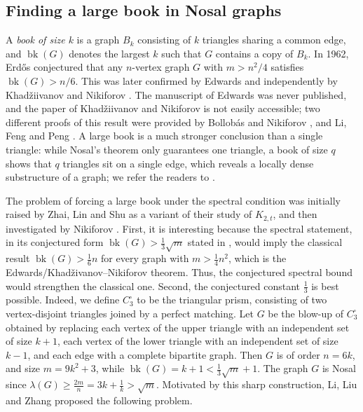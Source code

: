 \documentclass[10pt,a4paper]{amsart}
\newcommand{\bk}{\operatorname{bk}}
\renewcommand{\ge}{\geqslant}
\begin{document}
\subsection{Finding a large book in Nosal graphs}

A \emph{book of size $k$} is a graph $B_k$ consisting of $k$ triangles sharing a common edge, and $\bk(G)$ denotes the largest $k$ such that $G$ contains a copy of $B_k$. 
In 1962, Erd\H{o}s \cite{Erd1962} conjectured that any $n$-vertex graph $G$ with $m>n^2/4$ satisfies \( \bk (G) >  n/6 \). 
This was later confirmed by Edwards \cite{Edw1977} and independently by Khad\v{z}iivanov and Nikiforov  \cite{KN1979}. 
The manuscript of Edwards was never published, and the paper of Khad\v{z}iivanov and Nikiforov is not easily accessible;  
two different proofs of this result were  provided by Bollob\'{a}s and Nikiforov \cite{BN05}, and  Li, Feng and Peng \cite{LFP2024-triangular}. 
A large book is a much stronger conclusion than a single triangle: while Nosal's theorem only
guarantees one triangle, a book of size $q$ shows that $q$ triangles sit on a single
edge, which reveals a locally dense substructure of a graph; we refer the readers to \cite{Mubayi2012,CFS2020,ZL2022jgt,LiuMiao2025,MiaoLiuDam2026}. 

\smallskip  
The problem of forcing a large book under the spectral condition was initially raised by Zhai, Lin and Shu \cite{ZLS2021} as a variant of their study of  $K_{2,t}$, and then investigated by Nikiforov \cite{Nikiforov21}.  
First, it is interesting because the spectral statement, in its conjectured form $\bk (G)> \frac13\sqrt{m}$ stated in \cite{LiLiuZhang26}, 
would imply the classical result $\bk(G)>\frac16 n$ for every graph with $m>\frac{1}{4} n^2$, 
which is the Edwards/Khad\v{z}ivanov--Nikiforov theorem. Thus, the conjectured spectral bound would strengthen the classical one. 
Second, the conjectured constant $\frac13$ is best possible. Indeed, we define $C_3^{\square}$ to be the triangular prism, consisting of two vertex-disjoint triangles joined by a perfect matching. Let $G$ be the blow-up of $C_3^{\square}$ obtained by replacing each vertex of the upper triangle with an independent set of size $k+1$, each vertex of the lower triangle with an independent set of size $k-1$,
and each edge with a complete bipartite graph. Then $G$ is of order $n=6k$, and size $m=9k^2+3$, while $\bk(G)=k+1< \frac13\sqrt{m}+1$. The graph $G$ is 
Nosal since $\lambda (G)\ge \frac{2m}{n} =3k + \frac{1}{k} > \sqrt{m}$.  
Motivated by this sharp construction, Li, Liu
and Zhang \cite{LiLiuZhang26} proposed the following problem.
\end{document}
